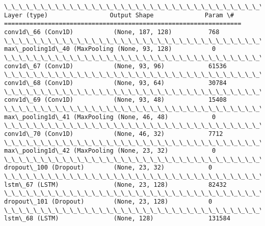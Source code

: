 \documentclass[11pt]{article}
\begin{document}
    \begin{Verbatim}[commandchars=\\\{\}]
\_\_\_\_\_\_\_\_\_\_\_\_\_\_\_\_\_\_\_\_\_\_\_\_\_\_\_\_\_\_\_\_\_\_\_\_\_\_\_\_\_\_\_\_\_\_\_\_\_\_\_\_\_\_\_\_\_\_\_\_\_\_\_\_\_
Layer (type)                 Output Shape              Param \#   
=================================================================
conv1d\_66 (Conv1D)           (None, 187, 128)          768       
\_\_\_\_\_\_\_\_\_\_\_\_\_\_\_\_\_\_\_\_\_\_\_\_\_\_\_\_\_\_\_\_\_\_\_\_\_\_\_\_\_\_\_\_\_\_\_\_\_\_\_\_\_\_\_\_\_\_\_\_\_\_\_\_\_
max\_pooling1d\_40 (MaxPooling (None, 93, 128)           0         
\_\_\_\_\_\_\_\_\_\_\_\_\_\_\_\_\_\_\_\_\_\_\_\_\_\_\_\_\_\_\_\_\_\_\_\_\_\_\_\_\_\_\_\_\_\_\_\_\_\_\_\_\_\_\_\_\_\_\_\_\_\_\_\_\_
conv1d\_67 (Conv1D)           (None, 93, 96)            61536     
\_\_\_\_\_\_\_\_\_\_\_\_\_\_\_\_\_\_\_\_\_\_\_\_\_\_\_\_\_\_\_\_\_\_\_\_\_\_\_\_\_\_\_\_\_\_\_\_\_\_\_\_\_\_\_\_\_\_\_\_\_\_\_\_\_
conv1d\_68 (Conv1D)           (None, 93, 64)            30784     
\_\_\_\_\_\_\_\_\_\_\_\_\_\_\_\_\_\_\_\_\_\_\_\_\_\_\_\_\_\_\_\_\_\_\_\_\_\_\_\_\_\_\_\_\_\_\_\_\_\_\_\_\_\_\_\_\_\_\_\_\_\_\_\_\_
conv1d\_69 (Conv1D)           (None, 93, 48)            15408     
\_\_\_\_\_\_\_\_\_\_\_\_\_\_\_\_\_\_\_\_\_\_\_\_\_\_\_\_\_\_\_\_\_\_\_\_\_\_\_\_\_\_\_\_\_\_\_\_\_\_\_\_\_\_\_\_\_\_\_\_\_\_\_\_\_
max\_pooling1d\_41 (MaxPooling (None, 46, 48)            0         
\_\_\_\_\_\_\_\_\_\_\_\_\_\_\_\_\_\_\_\_\_\_\_\_\_\_\_\_\_\_\_\_\_\_\_\_\_\_\_\_\_\_\_\_\_\_\_\_\_\_\_\_\_\_\_\_\_\_\_\_\_\_\_\_\_
conv1d\_70 (Conv1D)           (None, 46, 32)            7712      
\_\_\_\_\_\_\_\_\_\_\_\_\_\_\_\_\_\_\_\_\_\_\_\_\_\_\_\_\_\_\_\_\_\_\_\_\_\_\_\_\_\_\_\_\_\_\_\_\_\_\_\_\_\_\_\_\_\_\_\_\_\_\_\_\_
max\_pooling1d\_42 (MaxPooling (None, 23, 32)            0         
\_\_\_\_\_\_\_\_\_\_\_\_\_\_\_\_\_\_\_\_\_\_\_\_\_\_\_\_\_\_\_\_\_\_\_\_\_\_\_\_\_\_\_\_\_\_\_\_\_\_\_\_\_\_\_\_\_\_\_\_\_\_\_\_\_
dropout\_100 (Dropout)        (None, 23, 32)            0         
\_\_\_\_\_\_\_\_\_\_\_\_\_\_\_\_\_\_\_\_\_\_\_\_\_\_\_\_\_\_\_\_\_\_\_\_\_\_\_\_\_\_\_\_\_\_\_\_\_\_\_\_\_\_\_\_\_\_\_\_\_\_\_\_\_
lstm\_67 (LSTM)               (None, 23, 128)           82432     
\_\_\_\_\_\_\_\_\_\_\_\_\_\_\_\_\_\_\_\_\_\_\_\_\_\_\_\_\_\_\_\_\_\_\_\_\_\_\_\_\_\_\_\_\_\_\_\_\_\_\_\_\_\_\_\_\_\_\_\_\_\_\_\_\_
dropout\_101 (Dropout)        (None, 23, 128)           0         
\_\_\_\_\_\_\_\_\_\_\_\_\_\_\_\_\_\_\_\_\_\_\_\_\_\_\_\_\_\_\_\_\_\_\_\_\_\_\_\_\_\_\_\_\_\_\_\_\_\_\_\_\_\_\_\_\_\_\_\_\_\_\_\_\_
lstm\_68 (LSTM)               (None, 128)               131584    

\end{Verbatim}
\end{document}
